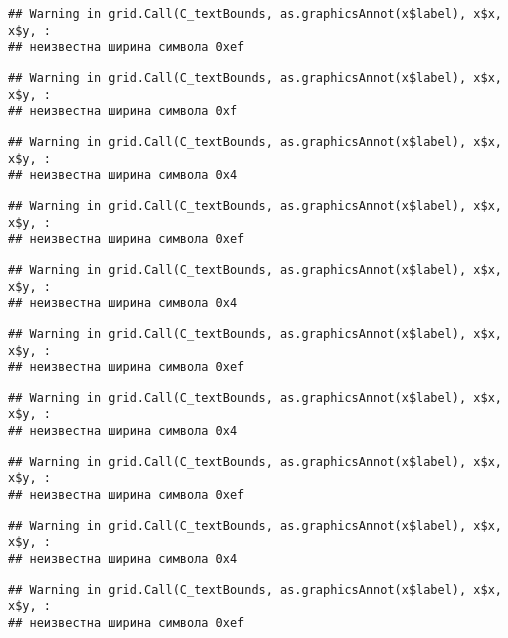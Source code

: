 \documentclass[
]{article}
\begin{document}
\begin{verbatim}
## Warning in grid.Call(C_textBounds, as.graphicsAnnot(x$label), x$x, x$y, :
## неизвестна ширина символа 0xef
\end{verbatim}

\begin{verbatim}
## Warning in grid.Call(C_textBounds, as.graphicsAnnot(x$label), x$x, x$y, :
## неизвестна ширина символа 0xf
\end{verbatim}

\begin{verbatim}
## Warning in grid.Call(C_textBounds, as.graphicsAnnot(x$label), x$x, x$y, :
## неизвестна ширина символа 0x4
\end{verbatim}

\begin{verbatim}
## Warning in grid.Call(C_textBounds, as.graphicsAnnot(x$label), x$x, x$y, :
## неизвестна ширина символа 0xef
\end{verbatim}

\begin{verbatim}
## Warning in grid.Call(C_textBounds, as.graphicsAnnot(x$label), x$x, x$y, :
## неизвестна ширина символа 0x4
\end{verbatim}

\begin{verbatim}
## Warning in grid.Call(C_textBounds, as.graphicsAnnot(x$label), x$x, x$y, :
## неизвестна ширина символа 0xef
\end{verbatim}

\begin{verbatim}
## Warning in grid.Call(C_textBounds, as.graphicsAnnot(x$label), x$x, x$y, :
## неизвестна ширина символа 0x4
\end{verbatim}

\begin{verbatim}
## Warning in grid.Call(C_textBounds, as.graphicsAnnot(x$label), x$x, x$y, :
## неизвестна ширина символа 0xef
\end{verbatim}

\begin{verbatim}
## Warning in grid.Call(C_textBounds, as.graphicsAnnot(x$label), x$x, x$y, :
## неизвестна ширина символа 0x4
\end{verbatim}

\begin{verbatim}
## Warning in grid.Call(C_textBounds, as.graphicsAnnot(x$label), x$x, x$y, :
## неизвестна ширина символа 0xef
\end{verbatim}
\end{document}
